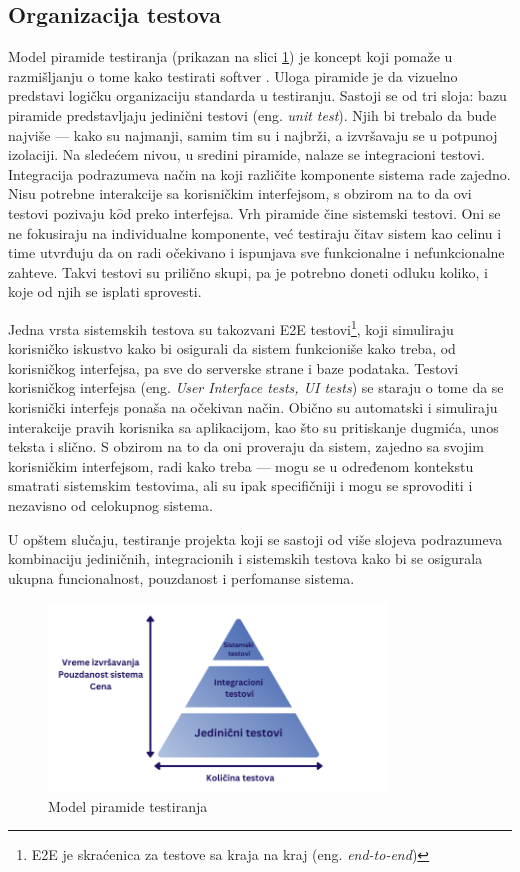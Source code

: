 \documentclass[12pt,oneside]{memoir}
\begin{document}
\subsection{Organizacija testova}
\par Model piramide testiranja (prikazan na slici \ref{fig:piramida}) je koncept koji pomaže u razmišljanju o tome kako testirati softver \cite{cohn}. Uloga piramide je da vizuelno predstavi logičku organizaciju standarda u testiranju. Sastoji se od tri sloja: bazu piramide predstavljaju jedinični testovi (eng. \emph{unit test}). Njih bi trebalo da bude najviše --- kako su najmanji, samim tim su i najbrži, a izvršavaju se u potpunoj izolaciji. Na sledećem nivou, u sredini piramide, nalaze se integracioni testovi. Integracija podrazumeva način na koji različite komponente sistema rade zajedno. Nisu potrebne interakcije sa korisničkim interfejsom, s obzirom na to da ovi testovi pozivaju k$\hat{o}$d preko interfejsa. Vrh piramide čine sistemski testovi. Oni se ne fokusiraju na individualne komponente, već testiraju čitav sistem kao celinu i time utvrđuju da on radi očekivano i ispunjava sve funkcionalne i nefunkcionalne zahteve. Takvi testovi su prilično skupi, pa je potrebno doneti odluku koliko, i koje od njih se isplati sprovesti.
\par Jedna vrsta sistemskih testova su takozvani E2E testovi\footnote{E2E je skraćenica za testove sa kraja na kraj (eng. \emph{end-to-end})}, koji simuliraju korisničko iskustvo kako bi osigurali da sistem funkcioniše kako treba, od korisničkog interfejsa, pa sve do serverske strane i baze podataka. Testovi korisničkog interfejsa (eng. \emph{User Interface tests, UI tests}) se staraju o tome da se korisnički interfejs ponaša na očekivan način. Obično su automatski i simuliraju interakcije pravih korisnika sa aplikacijom, kao što su pritiskanje dugmića, unos teksta i slično. S obzirom na to da oni proveraju da sistem, zajedno sa svojim korisničkim interfejsom, radi kako treba --- mogu se u određenom kontekstu smatrati sistemskim testovima, ali su ipak specifičniji i mogu se sprovoditi i nezavisno od celokupnog sistema. 
\par U opštem slučaju, testiranje projekta koji se sastoji od više slojeva podrazumeva kombinaciju jediničnih, integracionih i sistemskih testova kako bi se osigurala ukupna funcionalnost, pouzdanost i perfomanse sistema.

\begin{figure}[!ht]
  \centering
  \label{fig:piramida}
  \includegraphics[width=0.8\textwidth]{piramidanova.png}
  \caption{Model piramide testiranja}
\end{figure}
\end{document}
